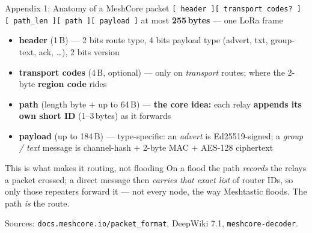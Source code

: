 \documentclass[aspectratio=\baAspect,t,9pt]{beamer}
\begin{document}
\begin{frame}[noframenumbering]{Appendix 1: Anatomy of a MeshCore packet}
  \small
  \texttt{[\,header\,][\,transport codes?\,][\,path\_len\,][\,path\,][\,payload\,]}
  \hfill at most \textbf{255\,bytes} --- one LoRa frame
  \medskip
  \begin{itemize}
    \item \textbf{header} (1\,B) --- 2 bits route type, 4 bits payload type
      (advert, txt, group-text, ack, \dots), 2 bits version
    \item \textbf{transport codes} (4\,B, optional) --- only on \emph{transport}
      routes; where the 2-byte \textbf{region code} rides
    \item \textbf{path} (length byte $+$ up to 64\,B) --- \textbf{the core idea:}
      each relay \textbf{appends its own short ID} (1--3\,bytes) as it forwards
    \item \textbf{payload} (up to 184\,B) --- type-specific: an \emph{advert} is
      Ed25519-signed; a \emph{group / text} message is channel-hash $+$ 2-byte
      MAC $+$ AES-128 ciphertext
  \end{itemize}
  \vfill
  \begin{alertblock}{This is what makes it routing, not flooding}
    On a flood the path \emph{records} the relays a packet crossed; a direct
    message then \emph{carries that exact list} of router IDs, so only those
    repeaters forward it --- not every node, the way Meshtastic floods. The path
    \emph{is} the route.
  \end{alertblock}
  {\footnotesize Sources:
  \texttt{docs.meshcore.io/packet\_format}, DeepWiki 7.1, \texttt{meshcore-decoder}.}
\end{frame}
\end{document}
